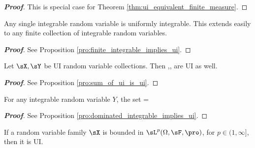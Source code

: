 \begin{proof}[\bf Proof]
This is special case for Theorem \ref{thm:ui_equivalent_finite_measure}. %
\end{proof}


\begin{proposition}\label{pro:finite_integrable_random_variables_implies_ui}
Any single integrable random variable is uniformly integrable. This extends easily to any finite collection of integrable random variables.
\end{proposition}

\begin{proof}[\bf Proof]
See Proposition \ref{pro:finite_integrable_implies_ui}.
\end{proof}

\begin{proposition}\label{pro:sum_of_ui_rv_is_ui}
Let $\sX,\sY$ be UI random variable collections. Then
\be
{}\quad {},\qquad {}\quad  {},\qquad {}\quad {}
\ee
are UI as well.
\end{proposition}

\begin{proof}[\bf Proof]
See Proposition \ref{pro:sum_of_ui_is_ui}.
\end{proof}



\begin{proposition}\label{pro:dominated_integrable_random_variable_implies_ui}
For any integrable random variable $Y$, the set
\be
\sX = \quad{}
\ee
\end{proposition}

\begin{proof}[\bf Proof]
See Proposition \ref{pro:dominated_integrable_implies_ui}.
\end{proof}


\begin{proposition}\label{pro:bounded_lp_implies_ui}
If a random variable family $\sX$ is bounded in $\sL^p(\Omega,\sF,\pro)$, for $p\in (1,\infty]$, then it is UI.
\end{proposition}

